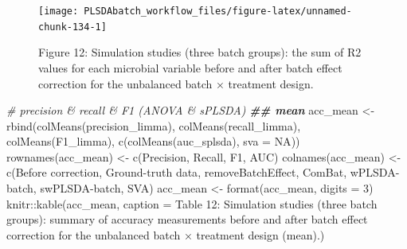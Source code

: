 \documentclass[
]{book}
\newenvironment{Shaded}{\begin{snugshade}}{\end{snugshade}}
\newcommand{\AttributeTok}[1]{\textcolor[rgb]{0.77,0.63,0.00}{#1}}
\newcommand{\CommentTok}[1]{\textcolor[rgb]{0.56,0.35,0.01}{\textit{#1}}}
\newcommand{\ConstantTok}[1]{\textcolor[rgb]{0.00,0.00,0.00}{#1}}
\newcommand{\DecValTok}[1]{\textcolor[rgb]{0.00,0.00,0.81}{#1}}
\newcommand{\DocumentationTok}[1]{\textcolor[rgb]{0.56,0.35,0.01}{\textbf{\textit{#1}}}}
\newcommand{\FunctionTok}[1]{\textcolor[rgb]{0.00,0.00,0.00}{#1}}
\newcommand{\NormalTok}[1]{#1}
\newcommand{\OtherTok}[1]{\textcolor[rgb]{0.56,0.35,0.01}{#1}}
\newcommand{\SpecialCharTok}[1]{\textcolor[rgb]{0.00,0.00,0.00}{#1}}
\newcommand{\StringTok}[1]{\textcolor[rgb]{0.31,0.60,0.02}{#1}}
\begin{document}
\begin{figure}

{\centering \texttt{[image: PLSDAbatch\_workflow\_files/figure-latex/unnamed-chunk-134-1]} 

}

\caption{Figure 12: Simulation studies (three batch groups): the sum of R2 values for each microbial variable before and after batch effect correction for the unbalanced batch × treatment design.}\label{fig:unnamed-chunk-134}
\end{figure}

\begin{Shaded}
\begin{Highlighting}[]
\CommentTok{\# precision \& recall \& F1 (ANOVA \& sPLSDA)}
\DocumentationTok{\#\# mean}
\NormalTok{acc\_mean }\OtherTok{\textless{}{-}} \FunctionTok{rbind}\NormalTok{(}\FunctionTok{colMeans}\NormalTok{(precision\_limma), }\FunctionTok{colMeans}\NormalTok{(recall\_limma), }
                  \FunctionTok{colMeans}\NormalTok{(F1\_limma), }\FunctionTok{c}\NormalTok{(}\FunctionTok{colMeans}\NormalTok{(auc\_splsda), }\AttributeTok{sva =} \ConstantTok{NA}\NormalTok{))}
\FunctionTok{rownames}\NormalTok{(acc\_mean) }\OtherTok{\textless{}{-}} \FunctionTok{c}\NormalTok{(}\StringTok{\textquotesingle{}Precision\textquotesingle{}}\NormalTok{, }\StringTok{\textquotesingle{}Recall\textquotesingle{}}\NormalTok{, }\StringTok{\textquotesingle{}F1\textquotesingle{}}\NormalTok{, }\StringTok{\textquotesingle{}AUC\textquotesingle{}}\NormalTok{)}
\FunctionTok{colnames}\NormalTok{(acc\_mean) }\OtherTok{\textless{}{-}} \FunctionTok{c}\NormalTok{(}\StringTok{\textquotesingle{}Before correction\textquotesingle{}}\NormalTok{, }\StringTok{\textquotesingle{}Ground{-}truth data\textquotesingle{}}\NormalTok{, }
                        \StringTok{\textquotesingle{}removeBatchEffect\textquotesingle{}}\NormalTok{, }\StringTok{\textquotesingle{}ComBat\textquotesingle{}}\NormalTok{, }
                        \StringTok{\textquotesingle{}wPLSDA{-}batch\textquotesingle{}}\NormalTok{, }\StringTok{\textquotesingle{}swPLSDA{-}batch\textquotesingle{}}\NormalTok{, }\StringTok{\textquotesingle{}SVA\textquotesingle{}}\NormalTok{)}
\NormalTok{acc\_mean }\OtherTok{\textless{}{-}} \FunctionTok{format}\NormalTok{(acc\_mean, }\AttributeTok{digits =} \DecValTok{3}\NormalTok{)}
\NormalTok{knitr}\SpecialCharTok{::}\FunctionTok{kable}\NormalTok{(acc\_mean, }\AttributeTok{caption =} \StringTok{\textquotesingle{}Table 12: Simulation studies (three batch groups): summary of accuracy measurements before and after batch effect correction for the unbalanced batch × treatment design (mean).\textquotesingle{}}\NormalTok{)}
\end{Highlighting}
\end{Shaded}
\end{document}

